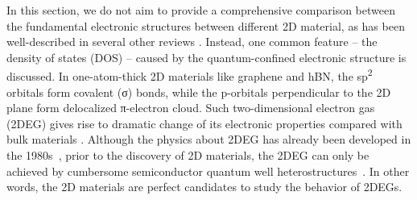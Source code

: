 %
In this section, we do not aim to provide a comprehensive comparison
between the fundamental electronic structures between different 2D
material, as has been well-described in several other reviews
\cite{Mas_Ballest_2011_review,Das_Sarma_2011_electron_gr,Butler_2013_review,Bhimanapati_2015_2D_rev,Novoselov_2016_vdW}.
%
Instead, one common feature -- the density of states (DOS) -- caused
by the quantum-confined electronic structure is discussed.
%
In
one-atom-thick 2D materials like graphene and hBN, the
sp\textsuperscript{2} orbitals form covalent (σ) bonds, while the
p-orbitals perpendicular to the 2D plane form delocalized π-electron
cloud\nocite{Ihn_2009_book}.
%
Such two-dimensional
electron gas (2DEG) gives rise to dramatic change of its electronic
properties compared with bulk materials \cite{Davies_1997_book}.
%
Although the physics about 2DEG has already been developed in the
1980s~\cite{Ando_1982_electron_2D}, prior to the discovery of 2D
materials, the 2DEG can only be achieved by cumbersome semiconductor
quantum well
heterostructures~\cite{Ihn_2009_book,Davies_1997_book}. In other
words, the 2D materials are perfect candidates to study the behavior
of 2DEGs.


